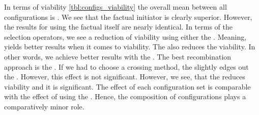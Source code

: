 \documentclass[./../../paper.tex]{subfiles}
\begin{document}
In terms of viability \autoref{tbl:configs_viability} the overall mean between all configurations is . We see that the factual initiator is clearly superior. However, the results for using the factual itself are nearly identical. In terms of the selection operators, we see a reduction of viability using either the . Meaning,  yields better results when it comes to viability. The  also reduces the viability. In other words, we achieve better results with the . The best recombination approach is the . If we had to choose a crossing method, the  slightly edges out the . However, this effect is not significant. However, we see, that the  reduces viability and it is significant. The effect of each configuration set is comparable with the effect of using the . Hence, the composition of configurations plays a comparatively minor role.
\end{document}

